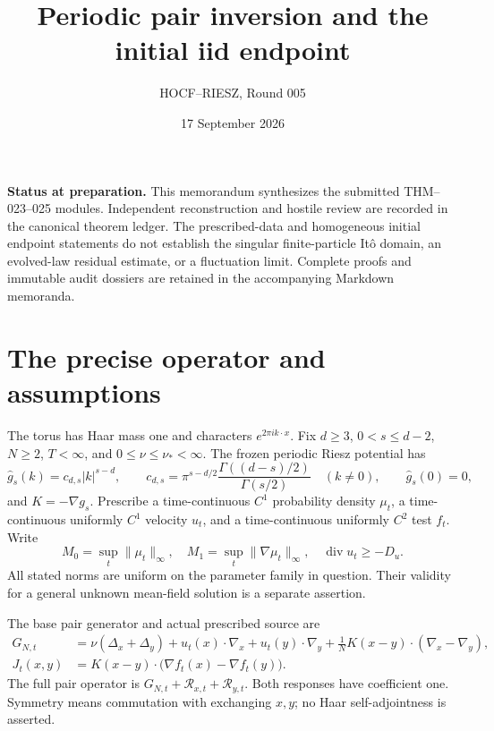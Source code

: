 \documentclass[10pt]{article}
\title{Periodic pair inversion and the initial iid endpoint}
\author{HOCF--RIESZ, Round 005}
\date{17 September 2026}
\newcommand{\R}{\mathcal R}
\newcommand{\norm}[1]{\lVert #1\rVert}
\begin{document}
\maketitle
\noindent\textbf{Status at preparation.} This memorandum synthesizes the submitted
THM--023--025 modules. Independent reconstruction and hostile review are recorded
in the canonical theorem ledger. The prescribed-data and homogeneous initial
endpoint statements do not establish the singular finite-particle It\^o domain,
an evolved-law residual estimate, or a fluctuation limit. Complete proofs and
immutable audit dossiers are retained in the accompanying Markdown memoranda.

\section*{The precise operator and assumptions}
The torus has Haar mass one and characters $e^{2\pi i k\cdot x}$. Fix
$d\ge3$, $0<s\le d-2$, $N\ge2$, $T<\infty$, and
$0\le\nu\le\nu_*<\infty$. The frozen periodic Riesz potential has
\[
 \widehat g_s(k)=c_{d,s}|k|^{s-d},\qquad
 c_{d,s}=\pi^{s-d/2}\frac{\Gamma((d-s)/2)}{\Gamma(s/2)}
 \quad(k\ne0),\qquad \widehat g_s(0)=0,
\]
and $K=-\nabla g_s$. Prescribe a time-continuous $C^1$ probability density
$\mu_t$, a time-continuous uniformly $C^1$ velocity $u_t$, and a time-continuous
uniformly $C^2$ test $f_t$. Write
\[
 M_0=\sup_t\norm{\mu_t}_\infty,\quad
 M_1=\sup_t\norm{\nabla\mu_t}_\infty,\quad
 \operatorname{div}u_t\ge-D_u.
\]
All stated norms are uniform on the parameter family in question. Their validity
for a general unknown mean-field solution is a separate assertion.

The base pair generator and actual prescribed source are
\begin{align*}
 G_{N,t}&=\nu(\Delta_x+\Delta_y)+u_t(x)\cdot\nabla_x+u_t(y)\cdot\nabla_y
       +\frac1N K(x-y)\cdot(\nabla_x-\nabla_y),\\
 J_t(x,y)&=K(x-y)\cdot\bigl(\nabla f_t(x)-\nabla f_t(y)\bigr).
\end{align*}
The full pair operator is $G_{N,t}+\R_{x,t}+\R_{y,t}$. Both responses have
coefficient one. Symmetry means commutation with exchanging $x,y$; no Haar
self-adjointness is asserted.
\end{document}
